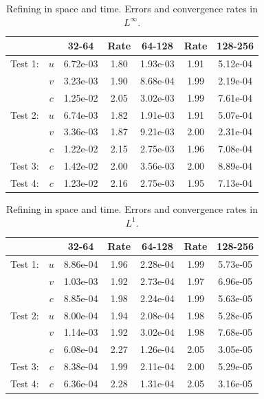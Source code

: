 \documentclass[final]{siamltex}
\begin{document}
\begin{table}[h]
\begin{center}
\caption{Refining in space and time.  Errors and convergence rates in $L^\infty$.}
\begin{tabular}{ccccccc}
& & 32-64 & Rate & 64-128 & Rate & 128-256 \\
\hline
Test 1:             & $u$ & 6.72e-03 & 1.80 & 1.93e-03 & 1.91 & 5.12e-04 \\
                    & $v$ & 3.23e-03 & 1.90 & 8.68e-04 & 1.99 & 2.19e-04 \\
                    & $c$ & 1.25e-02 & 2.05 & 3.02e-03 & 1.99 & 7.61e-04 \\
\hline
Test 2:             & $u$ & 6.74e-03 & 1.82 & 1.91e-03 & 1.91 & 5.07e-04 \\
                    & $v$ & 3.36e-03 & 1.87 & 9.21e-03 & 2.00 & 2.31e-04 \\
                    & $c$ & 1.22e-02 & 2.15 & 2.75e-03 & 1.96 & 7.08e-04 \\
\hline
Test 3:             & $c$ & 1.42e-02 & 2.00 & 3.56e-03 & 2.00 & 8.89e-04 \\
\hline
Test 4:             & $c$ & 1.23e-02 & 2.16 & 2.75e-03 & 1.95 & 7.13e-04
\end{tabular}
\end{center}
\end{table}

\begin{table}[h]
\begin{center}
\caption{Refining in space and time.  Errors and convergence rates in $L^1$.}
\begin{tabular}{ccccccc}
& & 32-64 & Rate & 64-128 & Rate & 128-256 \\
\hline
Test 1:             & $u$ & 8.86e-04 & 1.96 & 2.28e-04 & 1.99 & 5.73e-05 \\
                    & $v$ & 1.03e-03 & 1.92 & 2.73e-04 & 1.97 & 6.96e-05 \\
                    & $c$ & 8.85e-04 & 1.98 & 2.24e-04 & 1.99 & 5.63e-05 \\
\hline
Test 2:             & $u$ & 8.00e-04 & 1.94 & 2.08e-04 & 1.98 & 5.28e-05 \\
                    & $v$ & 1.14e-03 & 1.92 & 3.02e-04 & 1.98 & 7.68e-05 \\
                    & $c$ & 6.08e-04 & 2.27 & 1.26e-04 & 2.05 & 3.05e-05 \\
\hline
Test 3:             & $c$ & 8.38e-04 & 1.99 & 2.11e-04 & 2.00 & 5.29e-05 \\
\hline
Test 4:             & $c$ & 6.36e-04 & 2.28 & 1.31e-04 & 2.05 & 3.16e-05
\end{tabular}
\end{center}
\end{table}
\end{document}
